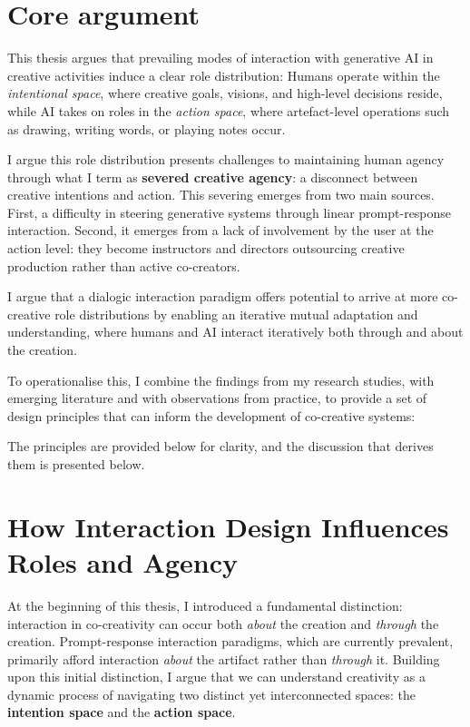 \section{Core argument}

This thesis argues that prevailing modes of interaction with generative AI in creative activities induce a clear role distribution: Humans operate within the \textit{intentional space}, where creative goals, visions, and high-level decisions reside, while AI takes on roles in the \textit{action space}, where artefact-level operations such as drawing, writing words, or playing notes occur.

I argue this role distribution presents challenges to maintaining human agency through what I term as \textbf{severed creative agency}: a disconnect between creative intentions and action. This severing emerges from two main sources. First, a difficulty in steering generative systems through linear prompt-response interaction. Second, it emerges from a lack of involvement by the user at the action level: they become instructors and directors outsourcing creative production rather than active co-creators.

I argue that a dialogic interaction paradigm offers potential to arrive at more co-creative role distributions by enabling an iterative mutual adaptation and understanding, where humans and AI interact iteratively both through and about the creation.

To operationalise this, I combine the findings from my research studies, with emerging literature and with observations from practice, to provide a set of design principles that can inform the development of co-creative systems:

The principles are provided below for clarity, and the discussion that derives them is presented below.


\section{How Interaction Design Influences Roles and Agency}

At the beginning of this thesis, I introduced a fundamental distinction: interaction in co-creativity can occur both \textit{about} the creation and \textit{through} the creation. Prompt-response interaction paradigms, which are currently prevalent, primarily afford interaction \textit{about} the artifact rather than \textit{through} it. Building upon this initial distinction, I argue that we can understand creativity as a dynamic process of navigating two distinct yet interconnected spaces: the \textbf{intention space} and the \textbf{action space}.

